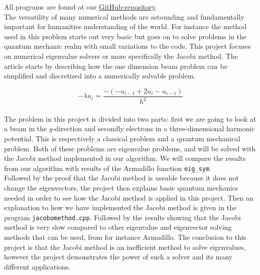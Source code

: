 \documentclass{article}
\begin{document}
All programs are found at our \href{https://github.com/Erikbgram/Fys3150}{GitHub-repository}. \\

The versatility of many numerical methods are astounding and fundamentally important for humanities understanding of the world. For instance the method used in this problem starts out very basic but goes on to solve problems in the quantum mechanic realm with small variations to the code. This project focuses on numerical eigenvalue solvers or more specifically the Jacobi method. The article starts by describing how the one dimension beam problem can be simplified and discretized into a numerically solvable problem.

\begin{equation*}
  -\lambda u_i = \frac{-(-u_{i-1} + 2u_i - u_{i-1})}{h^2}
\end{equation*} \\

The problem in this project is divided into two parts: first we are going to look at a beam in the $y$-direction and secondly electrons in a three-dimensional harmonic potential. This is respectively a classical problem and a quantum mechanical problem. Both of these problems are eigenvalue problems, and will be solved with the Jacobi method implemented in our algorithm. We will compare the results from our algorithm with results of the Armadillo function \texttt{eig\_sym}. \\

Followed by the proof that the Jacobi method is useable because it does not change the eigenvectors, the project then explains basic quantum mechanics needed in order to see how the Jacobi method is applied in this project. Then an explanation to how we have implemented the Jacobi method is given in the program \texttt{jacobomethod.cpp}. Followed by the results showing that the Jacobi method is very slow compared to other eigenvalue and eigenvector solving methods that can be used, from for instance Armadillo. The conclusion to this project is that the Jacobi method is an inefficient method to solve eigenvalues, however the project demonstrates the power of such a solver and its many different applications. \\
\end{document}

